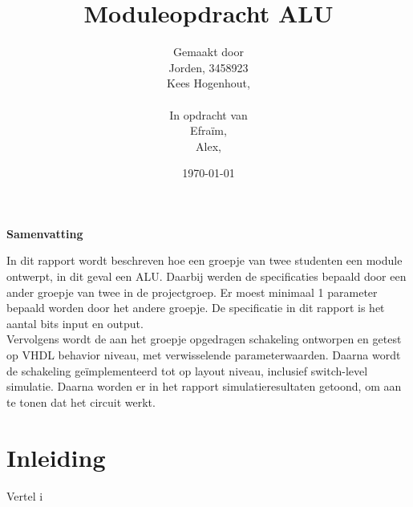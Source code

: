 \documentclass[11pt,twoside,a4paper]{article}
\title{Moduleopdracht ALU}
\author{
Gemaakt door\\
Jorden, 3458923\\
Kees Hogenhout, \\
\\
In opdracht van \\
Efraïm, \\
Alex, \\
}
\date{\today}
\begin{document}
\thispagestyle{empty}
\vspace{30 mm}

\begin{center}
\Large \bf 
Samenvatting
\end{center}
In dit rapport wordt beschreven hoe een groepje van twee studenten een module ontwerpt, in dit geval een ALU. Daarbij werden de specificaties bepaald door een ander groepje van twee in de projectgroep. Er moest minimaal 1 parameter bepaald worden door het andere groepje. De specificatie in dit rapport is het aantal bits input en output. \newline \\
Vervolgens  wordt de aan het groepje opgedragen schakeling ontworpen en getest op VHDL behavior niveau, met verwisselende parameterwaarden. Daarna wordt de schakeling geïmplementeerd tot op layout niveau, inclusief switch-level simulatie. 
Daarna worden er in het rapport simulatieresultaten getoond, om aan te tonen dat het circuit werkt. 
\clearpage

\tableofcontents
\clearpage

\section{Inleiding}
Vertel i
\end{document}
